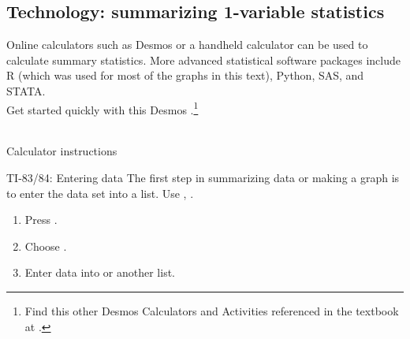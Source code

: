 

\D{\newpage}

\subsection{Technology: summarizing 1-variable statistics}
\label{summarizedata}

\noindent Online calculators such as Desmos or a handheld calculator can be used to calculate summary statistics.  More advanced statistical software packages include R (which was used for most of the graphs in this text), Python, SAS, and STATA.\\

\noindent Get started quickly with this Desmos .\footnote{Find this other Desmos Calculators and Activities referenced in the textbook at .}

\begin{center} 
\end{center}

\noindent \\Calculator instructions

\begin{onebox}{ TI-83/84: Entering data}
The first step in summarizing data or making a graph is to  enter the data set into a list. Use , .
\begin{enumerate}
\setlength{\itemsep}{0mm}
\item Press .
\item Choose .
\item Enter data into  or another list.
\end{enumerate}
\end{onebox}



